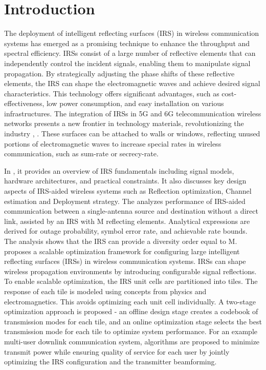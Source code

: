 \documentclass{article}
\begin{document}
\section{Introduction}
The deployment of intelligent reflecting surfaces (IRS) in wireless communication systems has emerged as a promising technique to enhance the throughput and spectral efficiency. IRSs consist of a large number of reflective elements that can independently control the incident signals, enabling them to manipulate signal propagation. By strategically adjusting the phase shifts of these reflective elements, the IRS can shape the electromagnetic waves and achieve desired signal characteristics. This technology offers significant advantages, such as cost-effectiveness, low power consumption, and easy installation on various infrastructures. The integration of IRSs in 5G and 6G telecommunication wireless networks presents a new frontier in technology materials, revolutionizing the industry \cite{1}, \cite{2}. These surfaces can be attached to walls or windows, reflecting unused portions of electromagnetic waves to increase special rates in wireless communication, such as sum-rate or secrecy-rate.
\par In \cite{3}, it provides an overview of IRS fundamentals including signal models, hardware architectures, and practical constraints. It also discusses key design aspects of IRS-aided wireless systems such as Reflection optimization, Channel estimation and Deployment strategy.
The \cite{4} analyzes performance of IRS-aided communication between a single-antenna source and destination without a direct link, assisted by an IRS with M reflecting elements. Analytical expressions are derived for outage probability, symbol error rate, and achievable rate bounds. The analysis shows that the IRS can provide a diversity order equal to M. \cite{5} proposes a scalable optimization framework for configuring large intelligent reflecting surfaces (IRSs) in wireless communication systems. IRSs can shape wireless propagation environments by introducing configurable signal reflections.
To enable scalable optimization, the IRS unit cells are partitioned into tiles. The response of each tile is modeled using concepts from physics and electromagnetics. This avoids optimizing each unit cell individually. A two-stage optimization approach is proposed - an offline design stage creates a codebook of transmission modes for each tile, and an online optimization stage selects the best transmission mode for each tile to optimize system performance.
For an example multi-user downlink communication system, algorithms are proposed to minimize transmit power while ensuring quality of service for each user by jointly optimizing the IRS configuration and the transmitter beamforming.
\end{document}
